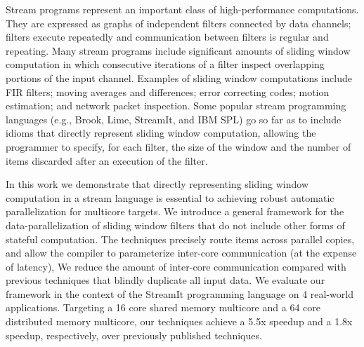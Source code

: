 Stream programs represent an important class of high-performance
computations. They are expressed as graphs of independent filters
connected by data channels; filters execute repeatedly and
communication between filters is regular and repeating.  Many stream
programs include significant amounts of sliding window computation in
which consecutive iterations of a filter inspect overlapping portions
of the input channel.  Examples of sliding window computations include
FIR filters; moving averages and differences; error correcting
codes; motion estimation; and network packet inspection.  Some popular
stream programming languages (e.g., Brook, Lime, StreamIt, and IBM
SPL) go so far as to include idioms that directly represent sliding
window computation, allowing the programmer to specify, for each
filter, the size of the window and the number of items discarded after
an execution of the filter.

In this work we demonstrate that directly representing sliding window
computation in a stream language is essential to achieving robust
automatic parallelization for multicore targets. We introduce a
general framework for the data-parallelization of sliding window
filters that do not include other forms of stateful computation.  The
techniques precisely route items across parallel copies, and allow the
compiler to parameterize inter-core communication (at the expense of
latency), We reduce the amount of inter-core communication compared
with previous techniques that blindly duplicate all input data.  We
evaluate our framework in the context of the StreamIt programming
language on 4 real-world applications.  Targeting a 16 core shared
memory multicore and a 64 core distributed memory multicore, our
techniques achieve a 5.5x speedup and a 1.8x speedup, respectively,
over previously published techniques.

